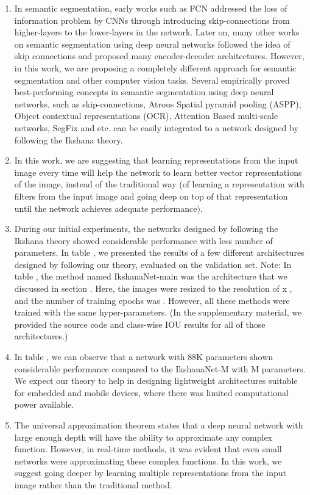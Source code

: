 \documentclass{article}
\begin{document}
\begin{enumerate}
\item In semantic segmentation, early works such as FCN addressed the loss of information problem by CNNs through introducing skip-connections from higher-layers to the lower-layers in the network. Later on, many other works on semantic segmentation using deep neural networks followed the idea of skip connections and proposed many encoder-decoder architectures. However, in this work, we are proposing a completely different approach for semantic segmentation and other computer vision tasks. Several empirically proved best-performing concepts in semantic segmentation using deep neural networks, such as skip-connections, Atrous Spatial pyramid pooling (ASPP), Object contextual representations (OCR), Attention Based multi-scale networks, SegFix and etc. can be easily integrated to a network designed by following the Ikshana theory.
\item In this work, we are suggesting that learning representations from the input image every time will help the network to learn better vector representations of the image, instead of the traditional way (of learning a representation with  filters from the input image and going deep on top of that representation until the network achieves adequate performance).
\item During our initial experiments, the networks designed by following the Ikshana theory showed considerable performance with less number of parameters. In table , we presented the results of a few different architectures designed by following our theory, evaluated on the validation set.  Note: In table , the method named IkshanaNet-main was the architecture that we discussed in section . Here, the images were resized to the resolution of  x , and the number of training epochs was . However, all these methods were trained with the same hyper-parameters. (In the supplementary material, we provided the source code and class-wise IOU results for all of those architectures.) 
\item In table , we can observe that a network with 88K parameters shown considerable performance compared to the IkshanaNet-M with M parameters. We expect our theory to help in designing lightweight architectures suitable for embedded and mobile devices, where there was limited computational power available.
\item The universal approximation theorem states that a deep neural network with large enough depth will have the ability to approximate any complex function. However, in real-time methods, it was evident that even small networks were approximating these complex functions. In this work, we suggest going deeper by learning multiple representations from the input image rather than the traditional method.

\end{enumerate}
\end{document}
